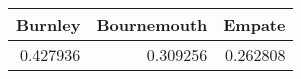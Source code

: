 \begin{tabular}{rrr}
\hline
   Burnley &   Bournemouth &   Empate \\
\hline
  0.427936 &      0.309256 & 0.262808 \\
\hline
\end{tabular}